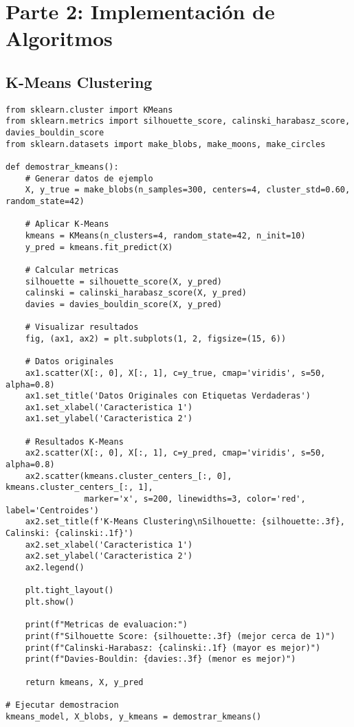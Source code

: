 \documentclass[12pt]{article}
\begin{document}
\section{Parte 2: Implementación de Algoritmos}

\subsection{K-Means Clustering}

\begin{lstlisting}
from sklearn.cluster import KMeans
from sklearn.metrics import silhouette_score, calinski_harabasz_score, davies_bouldin_score
from sklearn.datasets import make_blobs, make_moons, make_circles

def demostrar_kmeans():
    # Generar datos de ejemplo
    X, y_true = make_blobs(n_samples=300, centers=4, cluster_std=0.60, random_state=42)
    
    # Aplicar K-Means
    kmeans = KMeans(n_clusters=4, random_state=42, n_init=10)
    y_pred = kmeans.fit_predict(X)
    
    # Calcular metricas
    silhouette = silhouette_score(X, y_pred)
    calinski = calinski_harabasz_score(X, y_pred)
    davies = davies_bouldin_score(X, y_pred)
    
    # Visualizar resultados
    fig, (ax1, ax2) = plt.subplots(1, 2, figsize=(15, 6))
    
    # Datos originales
    ax1.scatter(X[:, 0], X[:, 1], c=y_true, cmap='viridis', s=50, alpha=0.8)
    ax1.set_title('Datos Originales con Etiquetas Verdaderas')
    ax1.set_xlabel('Caracteristica 1')
    ax1.set_ylabel('Caracteristica 2')
    
    # Resultados K-Means
    ax2.scatter(X[:, 0], X[:, 1], c=y_pred, cmap='viridis', s=50, alpha=0.8)
    ax2.scatter(kmeans.cluster_centers_[:, 0], kmeans.cluster_centers_[:, 1], 
                marker='x', s=200, linewidths=3, color='red', label='Centroides')
    ax2.set_title(f'K-Means Clustering\nSilhouette: {silhouette:.3f}, Calinski: {calinski:.1f}')
    ax2.set_xlabel('Caracteristica 1')
    ax2.set_ylabel('Caracteristica 2')
    ax2.legend()
    
    plt.tight_layout()
    plt.show()
    
    print(f"Metricas de evaluacion:")
    print(f"Silhouette Score: {silhouette:.3f} (mejor cerca de 1)")
    print(f"Calinski-Harabasz: {calinski:.1f} (mayor es mejor)")
    print(f"Davies-Bouldin: {davies:.3f} (menor es mejor)")
    
    return kmeans, X, y_pred

# Ejecutar demostracion
kmeans_model, X_blobs, y_kmeans = demostrar_kmeans()
\end{lstlisting}
\end{document}
